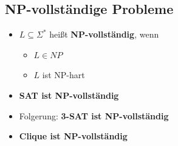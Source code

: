 \documentclass{scrartcl}
\begin{document}
\subsection{NP-vollständige Probleme}

\begin{itemize}
	\item $L \subseteq \Sigma^*$ heißt \textbf{NP-vollständig}, wenn
	\begin{itemize}
		\item $L \in NP$
		\item $L$ ist NP-hart
	\end{itemize}
	\item \textbf{SAT ist NP-vollständig}
	\item Folgerung: \textbf{3-SAT ist NP-vollständig}
	\item \textbf{Clique ist NP-vollständig}
\end{itemize}
\end{document}
